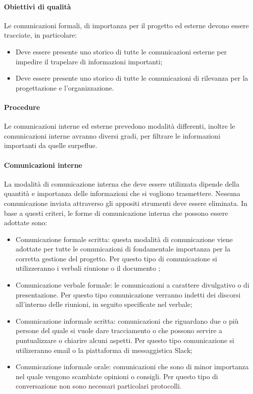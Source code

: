\documentclass[../NormeDiProgetto_v4.0.0.tex]{subfiles}
\begin{document}
			\paragraph{Obiettivi di qualità}
				Le comunicazioni formali, di importanza per il progetto ed esterne devono essere tracciate, in particolare:
				\begin{itemize}
					\item Deve essere presente uno storico di tutte le comunicazioni esterne per impedire il trapelare di informazioni importanti;
					\item Deve essere presente uno storico di tutte le comunicazioni di rilevanza per la progettazione e l'organizzazione.
				\end{itemize}

			\paragraph{Procedure}
				Le comunicazioni interne ed esterne prevedono modalità differenti, inoltre le comunicazioni interne avranno diversi gradi, per filtrare le informazioni importanti da quelle surpeflue.
			\paragraph{Comunicazioni interne}
				La modalità di comunicazione interna che deve essere utilizzata dipende della quantità e importanza delle informazioni che si vogliono trasmettere.
				Nessuna comunicazione inviata attraverso gli appositi strumenti deve essere eliminata.
				In base a questi criteri, le forme di comunicazione interna che possono essere adottate sono:
				\begin{itemize}
					\item Comunicazione formale scritta: questa modalità di comunicazione viene adottate per tutte le comunicazioni di fondamentale importanza per la corretta gestione del progetto. Per questo tipo di comunicazione si utilizzeranno i verbali riunione o il documento \pianodiprogetto;
					\item Comunicazione verbale formale: le comunicazioni a carattere divulgativo o di presentazione. Per questo tipo comunicazione verranno indetti dei discorsi all'interno delle riunioni, in seguito specificate nel verbale;
					\item Comunicazione informale scritta: comunicazioni che riguardano due o più persone del quale si vuole dare tracciamento o che possono servire a puntualizzare o chiarire alcuni aspetti. Per questo tipo comunicazione si utilizeranno email o la piattaforma di messaggistica Slack;
					\item Comunicazione informale orale: comunicazioni che sono di minor importanza nel quale vengono scambiate opinioni o consigli. Per questo tipo di conversazione non sono necessari particolari protocolli.
				\end{itemize}
\end{document}

